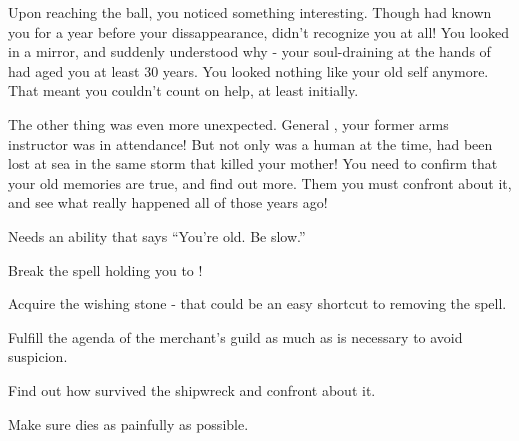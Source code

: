 \documentclass[char]{NeptuneBall}
\begin{document}
Upon reaching the ball, you noticed something interesting. Though \cAriel{} had known you for a year before your dissappearance, \cAriel{\they} didn't recognize you at all! You looked in a mirror, and suddenly understood why - your soul-draining at the hands of \cWitch{} had aged you at least 30 years. You looked nothing like your old self anymore. That meant you couldn't count on \cAriel{\their} help, at least initially.

The other thing was even more unexpected. General \cGeneral{}, your former arms instructor was in attendance! But not only was \cGeneral{\they} a human at the time, \cGeneral{\they} had been lost at sea in the same storm that killed your mother! You need to confirm that your old memories are true, and find out more. Them you must confront \cGeneral{\them} about it, and see what really happened all of those years ago!

Needs an ability that says "`You're old. Be slow."'

\begin{itemz}[Goals]
	\item Break the spell holding you to \cWitch{}!
	\item Acquire the wishing stone - that could be an easy shortcut to removing the spell.
  \item Fulfill the agenda of the merchant's guild as much as is necessary to avoid suspicion.
	\item Find out how \cGeneral{} survived the shipwreck and confront \cGeneral{\them} about it.
	\item Make sure \cWitch{} dies as painfully as possible.
\end{itemz}

\begin{contacts}
  \contact{}
\end{contacts}
\end{document}
